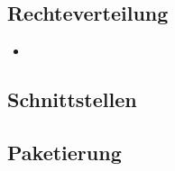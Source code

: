 \subsection{Rechteverteilung}
\label{sec:Rechteverteilung}
\begin{itemize}
	\item 
\end{itemize}

\subsection{Schnittstellen}
\label{sec:Schnittstellen}

\subsection{Paketierung}
\label{sec:Paketierung}
